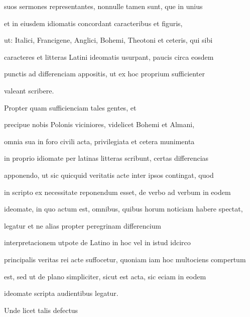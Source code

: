 \begin{VerbatimLatin}[firstnumber=26]
suos sermones representantes, nonnulle tamen sunt, que in unius

et in eiusdem idiomatis concordant caracteribus et figuris,

ut: Italici, Francigene, Anglici, Bohemi, Theotoni et ceteris, qui sibi

caracteres et litteras Latini ideomatis usurpant, paucis circa eosdem

punctis ad differenciam appositis, ut ex hoc proprium  sufficienter
\end{VerbatimLatin}


\renewcommand{\theFancyVerbLine}{\textcolor{green}{04-31\alph{FancyVerbLine}}}
\begin{VerbatimLatin}[firstnumber=1]
valeant scribere.

\indentK Propter quam sufficienciam tales gentes, et
\end{VerbatimLatin}

\renewcommand{\theFancyVerbLine}{04-\arabic{FancyVerbLine}\phantom{a}}

\begin{VerbatimLatin}[firstnumber=32]
precipue nobis Polonis viciniores, videlicet Bohemi et Almani,

omnia sua in foro civili acta, privilegiata et cetera munimenta

in proprio idiomate per latinas litteras scribunt, certas differencias

apponendo, ut sic quicquid veritatis acte inter ipsos contingat, quod

in scripto ex necessitate reponendum esset, de verbo ad verbum in eodem

ideomate, in quo actum est, omnibus, quibus horum noticiam habere spectat,

 legatur et ne alias propter peregrinam differencium 

 interpretacionem utpote de Latino in hoc vel in istud idcirco

principalis veritas rei acte suffocetur, quoniam iam hoc multociens compertum

est, sed ut de plano simpliciter, sicut est acta, sic eciam in eodem
\end{VerbatimLatin}
\renewcommand{\theFancyVerbLine}{\textcolor{green}{04-42\alph{FancyVerbLine}}}
\begin{VerbatimLatin}[firstnumber=1]
ideomate scripta audientibus legatur.

\indentK Unde licet talis defectus
\end{VerbatimLatin}
\renewcommand{\theFancyVerbLine}{04-\arabic{FancyVerbLine}\phantom{a}}

